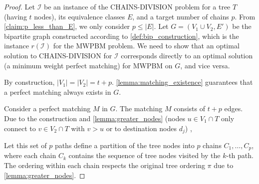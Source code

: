 \begin{proof}
    Let $\mathcal{I}$ be an instance of the \textsc{CHAINS-DIVISION} problem for a tree $T$ (having $t$ nodes), its equivalence classes $E$, and a target number of chains $p$. From \cref{claim:p_less_than_E}, we only consider $p \leq |E|$. Let $G = (V_1 \cup V_2, E')$ be the bipartite graph constructed according to \cref{def:bip_construction}, which is the instance $r(\mathcal{I})$ for the \textsc{MWPBM} problem. We need to show that an optimal solution to \textsc{CHAINS-DIVISION} for $\mathcal{I}$ corresponds directly to an optimal solution (a minimum weight perfect matching) for \textsc{MWPBM} on $G$, and vice versa.

    By construction, $|V_1| = |V_2| = t+p$. \cref{lemma:matching_existence} guarantees that a perfect matching always exists in $G$.

    Consider a perfect matching $M$ in $G$.   The matching $M$ consists of $t+p$ edges. Due to the construction and \cref{lemma:greater_nodes} (nodes $u \in V_1 \cap T$ only connect to $v \in V_2 \cap T$ with $v > u$ or to destination nodes $d_j$) ,  

    Let this set of $p$ paths define a partition of the tree nodes into $p$ chains $C_1, \dots, C_p$, where each chain $C_k$ contains the sequence of tree nodes visited by the $k$-th path. The ordering within each chain respects the original tree ordering $\pi$ due to \cref{lemma:greater_nodes}.


\end{proof}
